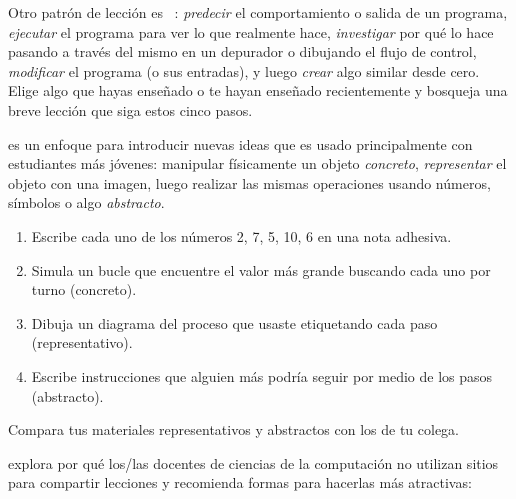 Otro patrón de lección es ~\cite{Sent2019}:
\emph{predecir} el comportamiento o salida de un programa,
\emph{ejecutar} el programa para ver lo que realmente hace,
\emph{investigar} por qué lo hace pasando a través del mismo en un depurador o dibujando el flujo de control,
\emph{modificar} el programa (o sus entradas),
y luego \emph{crear} algo similar desde cero.
Elige algo que hayas enseñado o te hayan enseñado recientemente
y bosqueja una breve lección que siga estos cinco pasos.
 
 
 
 es un enfoque para introducir nuevas ideas
que es usado principalmente con estudiantes más jóvenes:
manipular físicamente un objeto \emph{concreto},
\emph{representar} el objeto con una imagen,
luego realizar las mismas operaciones
usando números, símbolos o algo \emph{abstracto}.
 \begin{enumerate}
 
\item
  Escribe cada uno de los números 2, 7, 5, 10, 6 en una nota adhesiva.
 
\item
  Simula un bucle que encuentre el valor más grande buscando cada uno por turno (concreto).
 
\item
 Dibuja un diagrama del proceso que usaste etiquetando cada paso (representativo).
 
\item
  Escribe instrucciones que alguien más podría seguir por medio de los pasos (abstracto).
\end{enumerate}
 
 
Compara tus materiales representativos y abstractos con los de tu colega.
 
 
\cite{Leak2017} explora por qué los/las docentes de ciencias de la computación
no utilizan sitios para compartir lecciones y recomienda formas para hacerlas más atractivas:
 
